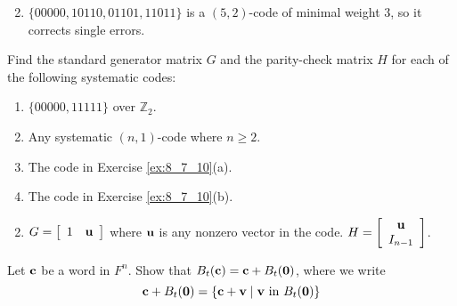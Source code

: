 \begin{multicols}{2}
\begin{ex}
\begin{enumerate}[label={\alph*.}]
\end{enumerate}
\begin{sol}
\begin{enumerate}[label={\alph*.}]
\setcounter{enumi}{1}
\item  $\{00000, 10110, 01101, 11011\}$ is a $(5, 2)$-code of minimal weight $3$, so it corrects single errors.

\end{enumerate}
\end{sol}
\end{ex}

\begin{ex}
Find the standard generator matrix $G$ and the parity-check matrix $H$ for each of the following systematic codes:

\begin{enumerate}[label={\alph*.}]
\item $\{00000, 11111\}$ over $\mathbb{Z}_2$.

\item Any systematic $(n, 1)$-code where $n \geq 2$.

\item The code in Exercise \ref{ex:8_7_10}(a).

\item The code in Exercise \ref{ex:8_7_10}(b).

\end{enumerate}
\begin{sol}
\begin{enumerate}[label={\alph*.}]
\setcounter{enumi}{1}
\item  $G = 
\left[ \begin{array}{cc}
1 & \textbf{u}
\end{array} \right]$ where $\textbf{u}$ is any nonzero vector in the code. $H = \left[ \begin{array}{c}
\textbf{u} \\
I_{n-1}
\end{array}\right]$.

\end{enumerate}
\end{sol}
\end{ex}

\begin{ex}
Let $\textbf{c}$ be a word in $F^{n}$. Show that $B_{t}(\textbf{c}) = \textbf{c} + B_{t}(\textbf{0})$, where we write 
\begin{equation*}
\textbf{c} + B_{t}(\textbf{0}) = \{\textbf{c} + \textbf{v} \mid \textbf{v} \mbox{ in } B_{t}(\textbf{0})\}
\end{equation*}
\end{ex}


\end{multicols}
